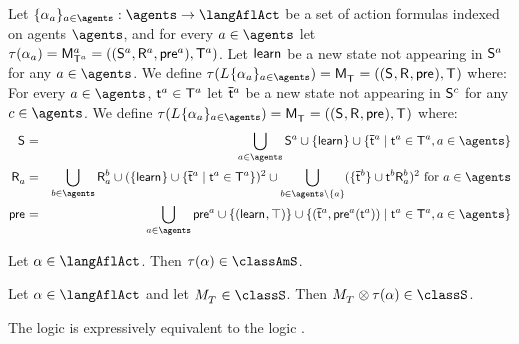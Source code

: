 \begin{definition}[Learning]\label{afl-s-learning}
Let $\{\alpha_\agentA\}_{\agentA \in \agents} : \agents \to \langAflAct$ be a set of action formulas indexed on agents $\agents$, and for every $\agentA \in \agents$ let $\tau(\alpha_\agentA) = \aPModel[\agentA]{\aStatesT[\agentA]} = \aPModelTuple[\agentA]{\aStatesT[\agentA]}$.
Let $\aStateLearn$ be a new state not appearing in $\aStates[\agentA]$ for any $\agentA \in \agents$.
We define $\tau(\learns \{\alpha_\agentA\}_{\agentA \in \agents}) = \aPModel{\aStatesT} = \aPModelTuple{\aStatesT}$ where:
For every $\agentA \in \agents$, $\aStateT[\agentA] \in \aStatesT[\agentA]$ let $\aPStateT[\agentA]$ be a new state not appearing in $\aStates[\agentC]$ for any $\agentC \in \agents$.
We define $\tau(\learns \{\alpha_\agentA\}_{\agentA \in \agents}) = \aPModel{\aStatesT} = \aPModelTuple{\aStatesT}$ where:
\begin{eqnarray*}
    \aStates &=& \bigcup_{\agentA \in \agents} \aStates[\agentA] \cup \{\aStateLearn\} \cup \{\aPStateT[\agentA] \mid \aStateT[\agentA] \in \aStatesT[\agentA], \agentA \in \agents\}\\
    \aAccessibilityA &=& \bigcup_{\agentB \in \agents} \aAccessibilityA[\agentB] \cup (\{\aStateLearn\} \cup \{\aPStateT[\agentA] \mid \aStateT[\agentA] \in \aStatesT[\agentA]\})^2 \cup \bigcup_{\agentB \in \agents \setminus \{\agentA\}} (\{\aPStateT[\agentB]\} \cup \aSuccessorsA[\agentB]{\aStateT[\agentB]})^2 \text{ for } \agentA \in \agents\\
    \aPrecondition &=& \bigcup_{\agentA \in \agents} \aPrecondition[\agentA] \cup \{(\aStateLearn, \top)\} \cup \{(\aPStateT[\agentA], \aPrecondition[\agentA](\aStateT[\agentA])) \mid \aStateT[\agentA] \in \aStatesT[\agentA], \agentA \in \agents\}
\end{eqnarray*}
\end{definition}

\begin{lemma}\label{afl-s-structure}
Let $\alpha \in \langAflAct$. Then $\tau(\alpha) \in \classAmS$.
\end{lemma}

\begin{lemma}\label{afl-s-exec}
Let $\alpha \in \langAflAct$ and 
let $\kPModel{\kStatesT} \in \classS$.
Then $\kPModel{\kStatesT} \exec \tau(\alpha) \in \classS$.
\end{lemma}

\begin{proposition}
The logic \logicAflS{} is expressively equivalent to the logic \logicAmlS{}.
\end{proposition}

